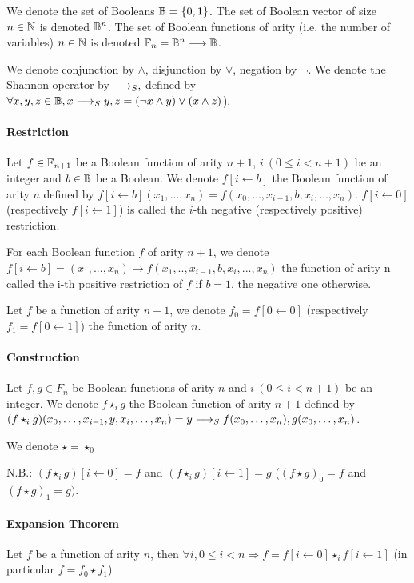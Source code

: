 \documentclass[a4paper,10pt]{article}
\begin{document}
We denote the set of Booleans $\mathbb{B} = \{0, 1\}$.
The set of Boolean vector of size $n\in\mathbb{N}$ is denoted $\mathbb{B}^n$.
The set of Boolean functions of arity (i.e. the number of variables) $n\in\mathbb{N}$ is denoted $\mathbb{F}_n = \mathbb{B}^n \longrightarrow \mathbb{B}$.


We denote conjunction by $\land$, disjunction by $\lor$, negation by $\lnot$.
We denote the Shannon operator by $\longrightarrow_S ,$ defined by $\forall x, y, z\in\mathbb{B}, x \longrightarrow_S y, z = (\lnot x \land y) \lor (x \land z)$).

\paragraph{Restriction\\}

Let $f\in\mathbb{F}_{n+1}$ be a Boolean function of arity $n+1$, $i~(0\leq i < n+1)$ be an integer and $b\in\mathbb{B}$ be a Boolean.
We denote $f[i\leftarrow b]$ the Boolean function of arity $n$ defined by $f[i\leftarrow b](x_1, \dots, x_n) = f(x_0, \dots, x_{i-1}, b, x_i, \dots, x_n)$.
$f[i\leftarrow 0]$ (respectively $f[i\leftarrow 1]$) is called the $i$-th negative (respectively positive) restriction.

For each Boolean function $f$ of arity $n+1$, we denote $f[i\leftarrow b] = (x_1, ..., x_n) \rightarrow f(x_1, .., x_{i-1}, b, x_i, ..., x_n)$ the function of arity n called the i-th positive restriction of $f$ if $b=1$, the negative one otherwise.


Let $f$ be a function of arity $n+1$, we denote $f_0 = f[0\leftarrow 0]$ (respectively $f_1 = f[0\leftarrow 1]$) the function of arity $n$.

\paragraph{Construction\\}

Let $f, g \in F_n$ be Boolean functions of arity $n$ and $i~(0\leq i < n+1)$ be an integer.
We denote $f\star_ig$ the Boolean function of arity $n+1$ defined by $(f\star_ig)(x_0, \dots, x_{i-1}, y, x_i, \dots, x_n) = y \longrightarrow_S f(x_0, \dots, x_n), g(x_0, \dots, x_n)$.

We denote $\star = \star_0$

N.B.: $(f\star_i g)[i\leftarrow 0] = f$ and $ (f\star_i g)[i\leftarrow 1] = g$ ($(f\star g)_0 = f$ and $ (f\star g)_1 = g)$.

\paragraph{Expansion Theorem\\}
Let $f$ be a function of arity $n$, then $\forall i, 0\leq i < n \Rightarrow f = f[i\leftarrow 0]\star_i f[i\leftarrow 1]$ (in particular $f = f_0 \star f_1$)
\end{document}
